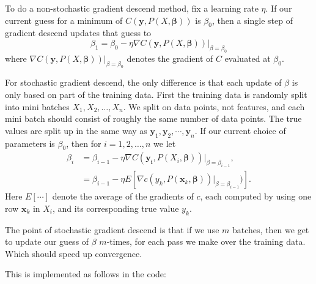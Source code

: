 \documentclass[parskip=half]{scrartcl}
\theoremstyle{definition}
\theoremstyle{remark}
\newcommand{\vect}[1]{{\bm{#1}}}
\begin{document}
To do a non-stochastic gradient descend method, fix a learning rate $\eta$. 
If our current guess for a minimum of $C(\vect{y}, P(X, \vect{\beta}))$ is $\beta_0$, then a single step of gradient descend updates that guess to 
\[
	\beta_{1} = \beta_0 - \eta \nabla C(\vect{y}, P(X, \vect{\beta})) \vert_{\beta = \beta_0}
\]
where $\nabla C(\vect{y}, P(X, \vect{\beta})) \vert_{\beta = \beta_0}$ denotes the gradient of $C$ evaluated at $\beta_0$.

For stochastic gradient descend, the only difference is that each update of $\beta$ is only based on part of the training data. 
First the training data is randomly split into mini batches $X_1, X_2, \ldots, X_n$.
We split on data points, not features, and each mini batch should consist of roughly the same number of data points. 
The true values are split up in the same way as $\vect{y}_1, \vect{y}_2, \cdots, \vect{y}_n$.
If our current choice of parameters is $\beta_0$, then for $i = 1,2, \ldots, n$ we let 
\begin{align*}
	\beta_i &= \beta_{i-1} - \eta \nabla C(\vect{y_i}, P(X_i, \vect{\beta})) \vert_{\beta = \beta_{i-1}}, \\
			&= \beta_{i-1} - \eta E \left[ \nabla c(y_k, P(\vect{x}_k, \vect{\beta})) \vert_{\beta = \beta_{i-1}})\right].
\end{align*}
Here $E[ \cdots ]$ denote the average of the gradients of $c$, each computed by using one row $\vect{x}_k$ in $X_i$, and its corresponding true value $y_k$.  

The point of stochastic gradient descend is that if we use $m$ batches, then we get to update our guess of $\beta$ $m$-times, for each pass we make over the training data. 
Which should speed up convergence. 

This is implemented as follows in the code:
\end{document}
